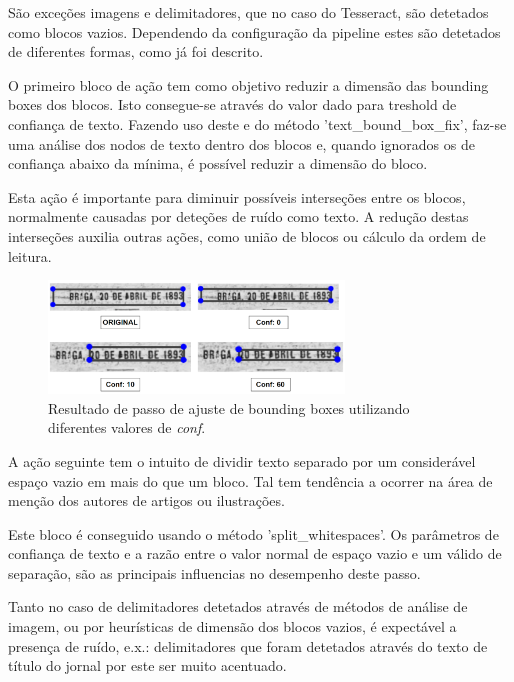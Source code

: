 São exceções imagens e delimitadores, que no caso do Tesseract, são detetados como blocos vazios. Dependendo da configuração da pipeline estes são detetados de diferentes formas, como já foi descrito.




O primeiro bloco de ação tem como objetivo reduzir a dimensão das bounding boxes dos blocos. Isto consegue-se através do valor dado para treshold de confiança de texto. Fazendo uso deste e do método 'text\_bound\_box\_fix', faz-se uma análise dos nodos de texto dentro dos blocos e, quando ignorados os de confiança abaixo da mínima, é possível reduzir a dimensão do bloco.

Esta ação é importante para diminuir possíveis interseções entre os blocos, normalmente causadas por deteções de ruído como texto. A redução destas interseções auxilia outras ações, como união de blocos ou cálculo da ordem de leitura.


\begin{figure}[H]
	\centering
	\includegraphics[width=0.7\textwidth]{images/ilustracoes/adjust_bounding_boxes_example.png}
	\caption{Resultado de passo de ajuste de bounding boxes utilizando diferentes valores de \textit{conf}.}
	\label{fig:adjust_bounding_boxes_example}
\end{figure}



A ação seguinte tem o intuito de dividir texto separado por um considerável espaço vazio em mais do que um bloco. Tal tem tendência a ocorrer na área de menção dos autores de artigos ou ilustrações.

Este bloco é conseguido usando o método 'split\_whitespaces'. Os parâmetros de confiança de texto e a razão entre o valor normal de espaço vazio e um válido de separação, são as principais influencias no desempenho deste passo.




Tanto no caso de delimitadores detetados através de métodos de análise de imagem, ou por heurísticas de dimensão dos blocos vazios, é expectável a presença de ruído, e.x.: delimitadores que foram detetados através do texto de título do jornal por este ser muito acentuado.


